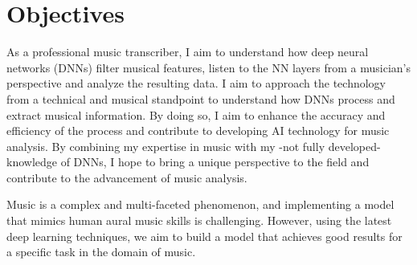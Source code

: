\section{Objectives}

As a professional music transcriber, I aim to understand how deep neural networks (DNNs) filter musical features, listen to the NN layers from a musician's perspective and analyze the resulting data. I aim to approach the technology from a technical and musical standpoint to understand how DNNs process and extract musical information. By doing so, I aim to enhance the accuracy and efficiency of the process and contribute to developing AI technology for music analysis. By combining my expertise in music with my -not fully developed- knowledge of DNNs, I hope to bring a unique perspective to the field and contribute to the advancement of music analysis.

Music is a complex and multi-faceted phenomenon, and implementing a model that mimics human aural music skills is challenging. However, using the latest deep learning techniques, we aim to build a model that achieves good results for a specific task in the domain of music.